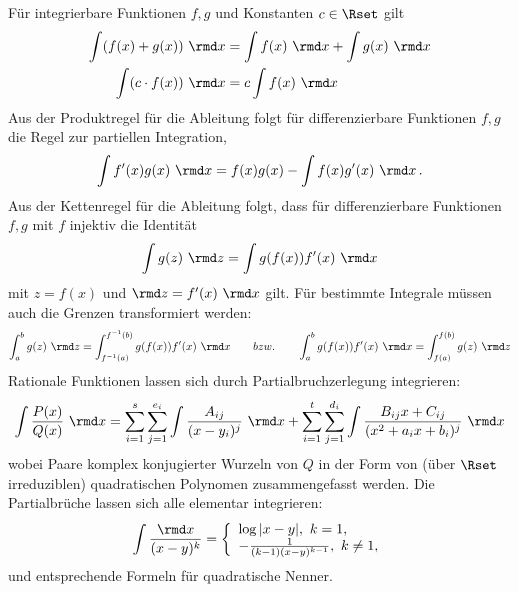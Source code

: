 \documentclass[a4paper,10pt]{article}
\begin{document}
Für integrierbare Funktionen $f,g$ und Konstanten $c\in\Rset$ gilt
\begin{align*}
\int (f(x)+g(x))~\rmd x &= \int f(x)~\rmd x+\int g(x)~\rmd x \\
\int (c\cdot f(x))~\rmd x &= c \int f(x)~\rmd x
\end{align*}
Aus der Produktregel für die Ableitung folgt für differenzierbare
Funktionen $f,g$ die Regel zur partiellen Integration,
\[
\int f'(x)g(x)~\rmd x=f(x)g(x)-\int f(x)g'(x)~\rmd x \,.
\]
Aus der Kettenregel für die Ableitung folgt, dass für differenzierbare
Funktionen $f,g$ mit $f$ injektiv die Identität
\[
\int g(z)~\rmd z = \int g(f(x))f'(x)~\rmd x
\]
mit $z=f(x)$ und $\rmd z=f'(x)~\rmd x$ gilt.
Für bestimmte Integrale müssen auch die Grenzen transformiert werden:
\[
\int_a^b g(z)~\rmd z = \int_{f^{-1}(a)}^{f^{-1}(b)} g(f(x))f'(x)~\rmd x
~~~~~~bzw.~~~~~~
\int_a^b g(f(x))f'(x)~\rmd x = \int_{f(a)}^{f(b)} g(z)~\rmd z
\]
Rationale Funktionen lassen sich durch Partialbruchzerlegung
integrieren:
\[
\int \frac{P(x)}{Q(x)}~\rmd x = \sum_{i=1}^s\sum_{j=1}^{e_i}\int \frac{A_{ij}}{(x-y_i)^j}~\rmd x + \sum_{i=1}^t\sum_{j=1}^{d_i}\int \frac{B_{ij}x+C_{ij}}{(x^2+a_i x+b_i)^j}~\rmd x
\]
wobei Paare komplex konjugierter Wurzeln von $Q$ in der Form von (über $\Rset$
irreduziblen) quadratischen Polynomen zusammengefasst werden. Die Partialbrüche lassen sich alle elementar integrieren:
\[
\int \frac{\rmd x}{(x-y)^k} = \left\{\begin{array}{l}\log|x-y|,~k=1,\\-\frac{1}{(k-1)(x-y)^{k-1}},~k\not=1,\end{array}\right.
\]
und entsprechende Formeln für quadratische Nenner.
\end{document}
